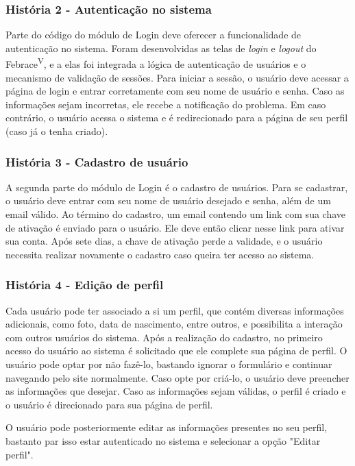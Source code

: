     \subsubsection{História 2 - Autenticação no sistema}
      Parte do código do módulo de Login deve oferecer a funcionalidade de autenticação no sistema. Foram desenvolvidas as telas de \textit{login} e \textit{logout} do Febrace\textsuperscript{V}, e a elas foi integrada a lógica de autenticação de usuários e o mecanismo de validação de sessões. Para iniciar a sessão, o usuário deve acessar a página de login e entrar corretamente com seu nome de usuário e senha. Caso as informações sejam incorretas, ele recebe a notificação do problema. Em caso contrário, o usuário acessa o sistema e é redirecionado para a página de seu perfil (caso já o tenha criado).

    \subsubsection{História 3 - Cadastro de usuário}
      A segunda parte do módulo de Login é o cadastro de usuários. Para se cadastrar, o usuário deve entrar com seu nome de usuário desejado e senha, além de um email válido. Ao término do cadastro, um email contendo um link com sua chave de ativação é enviado para o usuário. Ele deve então clicar nesse link para ativar sua conta. Após sete dias, a chave de ativação perde a validade, e o usuário necessita realizar novamente o cadastro caso queira ter acesso ao sistema.

    \subsubsection{História 4 - Edição de perfil}
      Cada usuário pode ter associado a si um perfil, que contém diversas informações adicionais, como foto, data de nascimento, entre outros, e possibilita a interação com outros usuários do sistema. Após a realização do cadastro, no primeiro acesso do usuário ao sistema é solicitado que ele complete sua página de perfil. O usuário pode optar por não fazê-lo, bastando ignorar o formulário e continuar navegando pelo site normalmente. Caso opte por criá-lo, o usuário deve preencher as informações que desejar. Caso as informações sejam válidas, o perfil é criado e o usuário é direcionado para sua página de perfil.

      O usuário pode posteriormente editar as informações presentes no seu perfil, bastanto par isso estar autenticado no sistema e selecionar a opção "Editar perfil".

